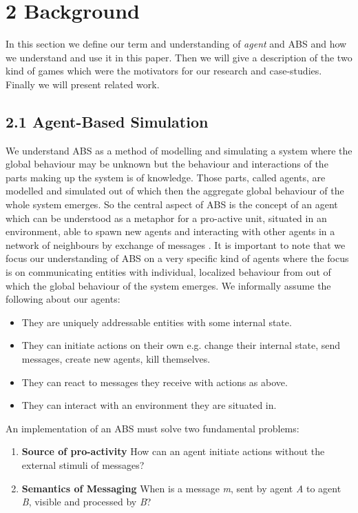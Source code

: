 \section{2 Background}
In this section we define our term and understanding of \textit{agent} and ABS and how we understand and use it in this paper. Then we will give a description of the two kind of games which were the motivators for our research and case-studies. Finally we will present related work.

\subsection{2.1 Agent-Based Simulation}
We understand ABS as a method of modelling and simulating a system where the global behaviour may be unknown but the behaviour and interactions of the parts making up the system is of knowledge. Those parts, called agents, are modelled and simulated out of which then the aggregate global behaviour of the whole system emerges. So the central aspect of ABS is the concept of an agent which can be understood as a metaphor for a pro-active unit, situated in an environment, able to spawn new agents and interacting with other agents in a network of neighbours by exchange of messages \cite{wooldridge_introduction_2009}. It is important to note that we focus our understanding of ABS on a very specific kind of agents where the focus is on communicating entities with individual, localized behaviour from out of which the global behaviour of the system emerges. We informally assume the following about our agents:

\begin{itemize}
	\item They are uniquely addressable entities with some internal state.
	\item They can initiate actions on their own e.g. change their internal state, send messages, create new agents, kill themselves.
	\item They can react to messages they receive with actions as above.
	\item They can interact with an environment they are situated in.
\end{itemize} 

An implementation of an ABS must solve two fundamental problems:

\begin{enumerate}
	\item \textbf{Source of pro-activity} How can an agent initiate actions without the external stimuli of messages?
	\item \textbf{Semantics of Messaging} When is a message \textit{m}, sent by agent \textit{A} to agent \textit{B}, visible and processed by \textit{B}?
\end{enumerate}

